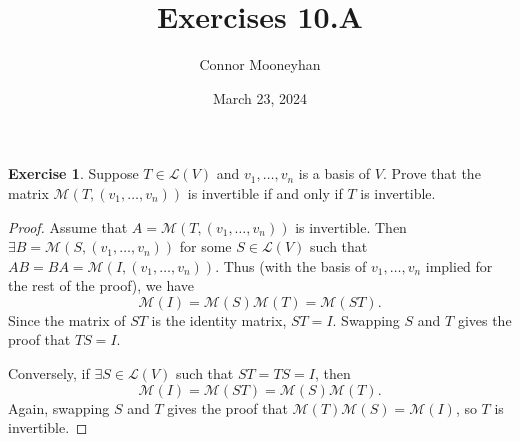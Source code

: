 \documentclass{article}
\title{Exercises 10.A}
\author{Connor Mooneyhan}
\date{March 23, 2024}
\theoremstyle{definition}
\newtheorem{ex}{Exercise}
\begin{document}
\maketitle

\begin{ex}
	Suppose $T \in \mathcal{L}(V)$ and $v_1, \dots, v_n$ is a basis of $V$. Prove that the matrix $\mathcal{M}\left( T, \left( v_1, \dots, v_n \right) \right)$ is invertible if and only if $T$ is invertible.
\end{ex}
\begin{proof}
	Assume that $A = \mathcal{M}( T, ( v_1, \dots, v_n ) )$ is invertible.
	Then $\exists B = \mathcal{M}( S, ( v_1, \dots, v_n ) )$ for some $S \in \mathcal{L}( V )$ such that $AB = BA = \mathcal{M}(I, (v_1, \dots, v_n))$.
	Thus (with the basis of $v_1, \dots, v_n$ implied for the rest of the proof), we have \begin{equation*}
		\mathcal{M}(I) = \mathcal{M}( S )\mathcal{M}( T ) = \mathcal{M}( ST ).
	\end{equation*}
	Since the matrix of $ST$ is the identity matrix, $ST = I$.
	Swapping $S$ and $T$ gives the proof that $TS = I$.

	Conversely, if $\exists S \in \mathcal{L}(V)$ such that $ST = TS = I$, then \begin{equation*}
		\mathcal{M}(I) = \mathcal{M}(ST) = \mathcal{M}(S)\mathcal{M}(T).
	\end{equation*}
	Again, swapping $S$ and $T$ gives the proof that $\mathcal{M}(T)\mathcal{M}(S) = \mathcal{M}(I)$, so $T$ is invertible.
\end{proof}
\end{document}
